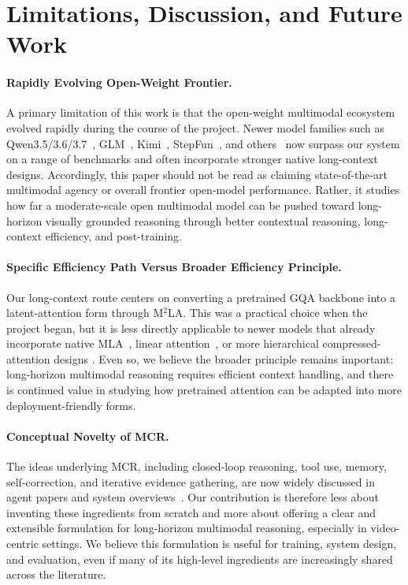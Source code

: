\documentclass[11pt, letterpaper]{template}
\theoremstyle{plain}
\theoremstyle{definition}
\theoremstyle{remark}
\begin{document}
\section{Limitations, Discussion, and Future Work}

\paragraph{Rapidly Evolving Open-Weight Frontier.}
A primary limitation of this work is that the open-weight multimodal ecosystem evolved rapidly during the course of the project. Newer model families such as Qwen3.5/3.6/3.7~\citep{qwen35blog}, GLM~\citep{zeng2026glm}, Kimi~\citep{team2026kimi}, StepFun~\citep{huang2026step}, and others~\citep{deepseekai2026deepseekv4, mimov25, minimax2026m3, meituanlongcatteam2026longcatnextlexicalizingmodalitiesdiscrete} now surpass our system on a range of benchmarks and often incorporate stronger native long-context designs. Accordingly, this paper should not be read as claiming state-of-the-art multimodal agency or overall frontier open-model performance. Rather, it studies how far a moderate-scale open multimodal model can be pushed toward long-horizon visually grounded reasoning through better contextual reasoning, long-context efficiency, and post-training.


\paragraph{Specific Efficiency Path Versus Broader Efficiency Principle.}
Our long-context route centers on converting a pretrained GQA backbone into a latent-attention form through M$^2$LA. This was a practical choice when the project began, but it is less directly applicable to newer models that already incorporate native MLA~\citep{liu2024deepseek,guo2025deepseek}, linear attention~\citep{team2025kimi}, or more hierarchical compressed-attention designs \citep{deepseekai2026deepseekv4}. Even so, we believe the broader principle remains important: long-horizon multimodal reasoning requires efficient context handling, and there is continued value in studying how pretrained attention can be adapted into more deployment-friendly forms.

\paragraph{Conceptual Novelty of MCR.}
The ideas underlying MCR, including closed-loop reasoning, tool use, memory, self-correction, and iterative evidence gathering, are now widely discussed in agent papers and system overviews~\citep{masterman2024landscape, wang2024survey, zhang2025survey, ning2025survey, ning2026code}. Our contribution is therefore less about inventing these ingredients from scratch and more about offering a clear and extensible formulation for long-horizon multimodal reasoning, especially in video-centric settings. We believe this formulation is useful for training, system design, and evaluation, even if many of its high-level ingredients are increasingly shared across the literature.
\end{document}
